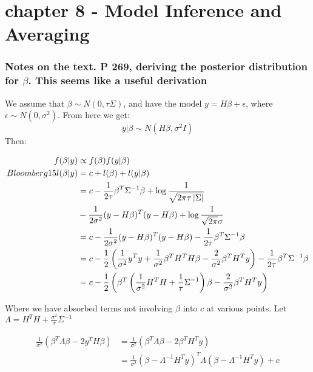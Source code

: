 \chapter{chapter 8 - Model Inference and Averaging}

\subsection*{Notes on the text. P 269, deriving the posterior distribution for $\beta$.
This seems like a useful derivation}

We assume that $\beta \sim N(0, \tau\Sigma)$, and have the model $y = H \beta + \epsilon$, where $\epsilon \sim N(0, \sigma^2)$. From here we get:
$$ y\vert\beta \sim N(H\beta, \sigma^2 I)$$
Then:

\begin{align*}
f(\beta \vert y) &\propto f(\beta) f(y \vert \beta)\\Bloomberg15

l(\beta | y) &= c + l(\beta) + l(y \vert \beta) \\
&= c - \frac{1}{2\tau} \beta^T \Sigma^{-1}\beta + \log{\frac{1}{\sqrt{2 \pi \tau \abs{\Sigma}}}} \\ 
&-  \frac{1}{2\sigma^2} (y - H\beta)^T  (y - H\beta) + \log{\frac{1}{\sqrt{2\pi} \sigma}}\\ 
&= c - \frac{1}{2\sigma^2} (y - H\beta)^T  (y - H\beta) - \frac{1}{2\tau} \beta^T \Sigma^{-1}\beta \\ 
&= c - \frac{1}{2} \left( \frac{1}{\sigma^2} y^T y +\frac{1}{\sigma^2}  \beta^T H^T  H\beta - \frac{2}{\sigma^2}  \beta^T H^T y\right) - \frac{1}{2\tau} \beta^T \Sigma^{-1}\beta  \\
&= c - \frac{1}{2} \left( \beta^T \left(\frac{1}{\sigma^2}H^T  H + \frac{1}{\tau}\Sigma^{-1}\right) \beta - \frac{2}{\sigma^2} \beta^T H^T y \right) 
\end{align*}

Where we have absorbed terms not involving $\beta$ into $c$ at various points.
Let $\Lambda = H^T H + \frac{\sigma^2}{\tau}\Sigma^{-1}$

\begin{align*}
    \frac{1}{\sigma^2} \left(\beta^T \Lambda \beta - 2 y^T  H \beta \right) &= \frac{1}{\sigma^2} \left(\beta^T \Lambda \beta - 2 \beta^T H^T y\right)\\
    &= \frac{1}{\sigma^2} (\beta - \Lambda^{-1}  H^T y)^T \Lambda(\beta - \Lambda^{-1}  H^T y) + c
\end{align*}  

